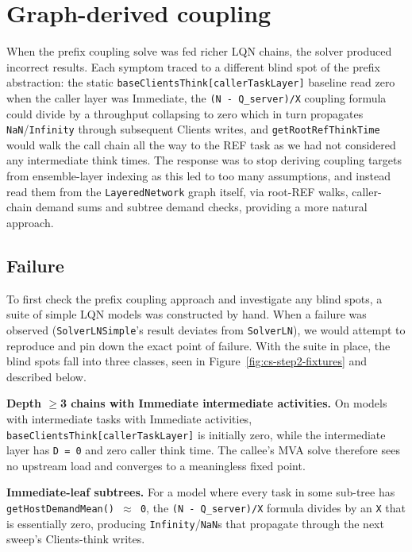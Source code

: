 \section{Graph-derived coupling}
\label{sec:contrib-step2}

When the prefix coupling solve was fed richer LQN chains, the solver produced incorrect results. Each symptom traced to a different blind spot of the prefix abstraction: the static \texttt{baseClientsThink[callerTaskLayer]} baseline read zero when the caller layer was Immediate, the \texttt{(N - Q\_server)/X} coupling formula could divide by a throughput collapsing to zero which in turn propagates \texttt{NaN}/\texttt{Infinity} through subsequent Clients writes, and \texttt{getRootRefThinkTime} would walk the call chain all the way to the REF task as we had not considered any intermediate think times. 
The response was to stop deriving coupling targets from ensemble-layer indexing as this led to too many assumptions, and instead read them from the \texttt{LayeredNetwork} graph itself, via root-REF walks, caller-chain demand sums and subtree demand checks, providing a more natural approach. 

\subsection{Failure}

To first check the prefix coupling approach and investigate any blind spots, a suite of simple LQN models was constructed by hand. When a failure was observed (\texttt{SolverLNSimple}'s result deviates from \texttt{SolverLN}), we would attempt to reproduce and pin down the exact point of failure. With the suite in place, the blind spots fall into three classes, seen in Figure~\ref{fig:cs-step2-fixtures} and described below.

\textbf{Depth $\geq$3 chains with Immediate intermediate activities.} On models with intermediate tasks with Immediate activities, \texttt{baseClientsThink[callerTaskLayer]} is initially zero, while the intermediate layer has \texttt{D = 0} and zero caller think time. The callee's MVA solve therefore sees no upstream load and converges to a meaningless fixed point.

\textbf{Immediate-leaf subtrees.} For a model where every task in some sub-tree has \texttt{getHostDemandMean() $\approx$ 0}, the \texttt{(N - Q\_server)/X} formula divides by an \texttt{X} that is essentially zero, producing \texttt{Infinity}/\texttt{NaN}s that propagate through the next sweep's Clients-think writes.

